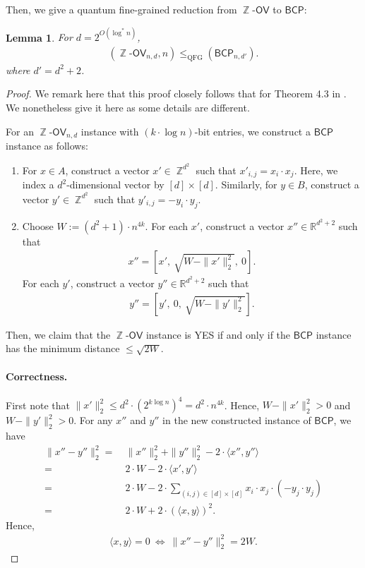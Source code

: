 \documentclass[10pt,a4paper]{article}
\newtheorem{lemma}[theorem]{Lemma}
\newcommand{\R}{\mathbb{R}}
\newcommand{\ip}[2]{\langle {#1} , {#2} \rangle}
\DeclareMathOperator*{\Z}{\mathbb{Z}}
\newcommand{\QFG}{\mathrm{QFG}}
\newcommand{\BCP}{\ensuremath{\mathsf{BCP}}}
\newcommand{\ZOV}{\ensuremath{\Z\text{-}\mathsf{OV}}}
\begin{document}
Then, we give a quantum fine-grained reduction from $\ZOV$ to $\BCP$:
\begin{lemma}\label{lem:zov_2_bcp}
For $d=2^{O(\log^* n)}$,
\begin{align}
    (\ZOV_{n,d}, n)\leq_{\QFG} (\BCP_{n,d'}).
\end{align}
where $d'=d^2+2$.
\end{lemma}
\begin{proof}
We remark here that this proof closely follows that for Theorem 4.3 in \cite{r17}. We nonetheless give it here as some details are different.

For an $\ZOV_{n,d}$ instance with $(k\cdot \log n)$-bit entries, we construct a $\BCP$ instance as follows:
\begin{enumerate}
    \item For $x\in A$, construct a vector $x'\in \Z^{d^2}$ such that $x'_{i,j}=x_i\cdot x_j$. Here, we index a $d^2$-dimensional vector by $[d]\times [d]$. Similarly, for $y\in B$, construct a vector $y'\in \Z^{d^2}$ such that $y'_{i,j}=-y_i \cdot y_j$.
    \item Choose $W:=(d^2+1)\cdot n^{4k}$. For each $x'$, construct a vector $x''\in \R^{d^2+2}$ such that 
    \begin{align}
        x''=\left[x',~ \sqrt{W-\|x'\|_2^2},~ 0\right].
    \end{align}  For each $y'$, construct a vector $y''\in \R^{d^2+2}$ such that 
    \begin{align}
        y''=\left[y',~ 0, ~ \sqrt{W-\|y'\|_2^2}\right].
    \end{align}
\end{enumerate}
Then, we claim that the $\ZOV$ instance is YES if and only if the $\BCP$ instance has the minimum distance $\leq \sqrt{2W}$.

\paragraph*{Correctness.} First note that $\|x'\|_2^2\leq d^2\cdot (2^{k\log n})^4=d^2\cdot n^{4k}$. Hence, $W-\|x'\|_2^2 > 0$ and $W-\|y'\|_2^2>0$. For any $x''$ and $y''$ in the new constructed instance of $\BCP$, we have
\begin{align}
    \|x''-y''\|_2^2=&~ \|x''\|_2^2+\|y''\|_2^2-2\cdot \ip{x''}{y''}\\
    =&~ 2\cdot W-2\cdot \ip{x'}{y'}\\
    =&~ 2\cdot W - 2\cdot \sum_{(i,j)\in [d]\times [d]}x_i\cdot x_j\cdot (-y_j\cdot y_j)\\
    =&~ 2\cdot W + 2\cdot (\ip{x}{y})^2.
\end{align}
Hence,
\begin{align}
    \ip{x}{y}=0~\Leftrightarrow~\|x''-y''\|_2^2= 2W.
\end{align}


\end{proof}
\end{document}
